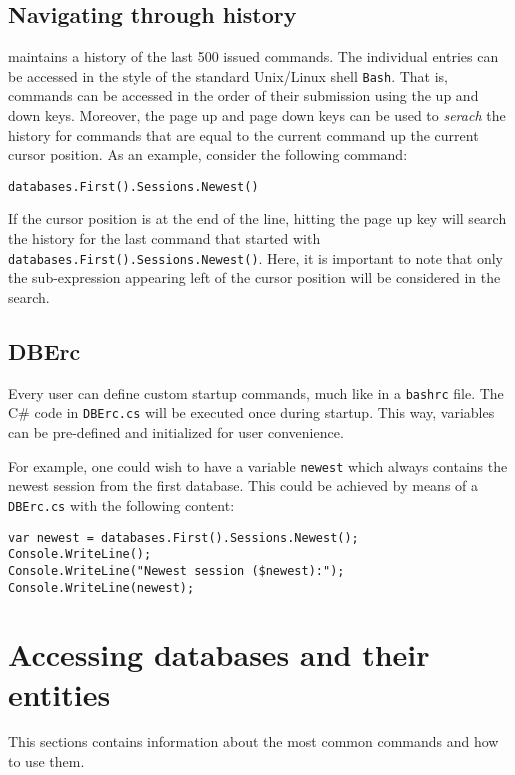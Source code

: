 \subsection{Navigating through history}
\BoSSSpad{} maintains a history of the last 500 issued commands. The individual entries can be accessed in the style of the standard Unix/Linux shell \lstinline{Bash}. That is, commands can be accessed in the order of their submission using the up and down keys. Moreover, the page up and page down keys can be used to \emph{serach} the history for commands that are equal to the current command up the current cursor position. As an example, consider the following command:
\begin{lstlisting}[title=Example history search]
databases.First().Sessions.Newest()
\end{lstlisting}
If the cursor position is at the end of the line, hitting the page up key will search the history for the last command that started with \lstinline{databases.First().Sessions.Newest()}. Here, it is important to note that only the sub-expression appearing left of the cursor position will be considered in the search. 


\subsection{DBErc}
\label{sec:dberec}
Every user can define custom startup commands, much like in a \lstinline{bashrc} file. The C\# code in \lstinline{DBErc.cs} will be executed once during \BoSSSpad{} startup. This way, variables can be pre-defined and initialized for user convenience.

For example, one could wish to have a variable \lstinline{newest} which always contains the newest session from the first database. This could be achieved by means of a \lstinline{DBErc.cs} with the following content:

\begin{lstlisting}[title=Example DBErc.cs]
var newest = databases.First().Sessions.Newest();
Console.WriteLine();
Console.WriteLine("Newest session ($newest):");
Console.WriteLine(newest);
\end{lstlisting}


\section{Accessing databases and their entities}
This sections contains information about the most common commands and how to use them.

